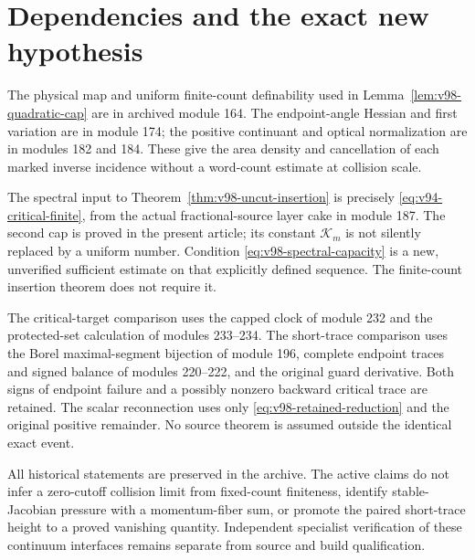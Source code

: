 \section{Dependencies and the exact new hypothesis}
\label{app:v98-dependencies}
The physical map and uniform finite-count definability used in
Lemma~\ref{lem:v98-quadratic-cap} are in archived module 164.
The endpoint-angle Hessian and first variation are in module 174;
the positive continuant and optical normalization are in modules 182
and 184. These give the area density and cancellation of each marked
inverse incidence without a word-count estimate at collision scale.

The spectral input to Theorem~\ref{thm:v98-uncut-insertion} is precisely
\eqref{eq:v94-critical-finite}, from the actual fractional-source
layer cake in module 187. The second cap is proved in the present
article; its constant $\mathcal K_m$ is not silently replaced by a
uniform number. Condition \eqref{eq:v98-spectral-capacity} is a new,
unverified sufficient estimate on that explicitly defined sequence.
The finite-count insertion theorem does not require it.

The critical-target comparison uses the capped clock of module 232
and the protected-set calculation of modules 233--234. The short-trace
comparison uses the Borel maximal-segment bijection of module 196,
complete endpoint traces and signed balance of modules 220--222, and
the original guard derivative. Both signs of endpoint failure and a
possibly nonzero backward critical trace are retained. The scalar
reconnection uses only \eqref{eq:v98-retained-reduction} and the
original positive remainder. No source theorem is assumed outside
the identical exact event.

All historical statements are preserved in the archive. The active
claims do not infer a zero-cutoff collision limit from fixed-count
finiteness, identify stable-Jacobian pressure with a momentum-fiber
sum, or promote the paired short-trace height to a proved vanishing
quantity. Independent specialist verification of these continuum
interfaces remains separate from source and build qualification.
